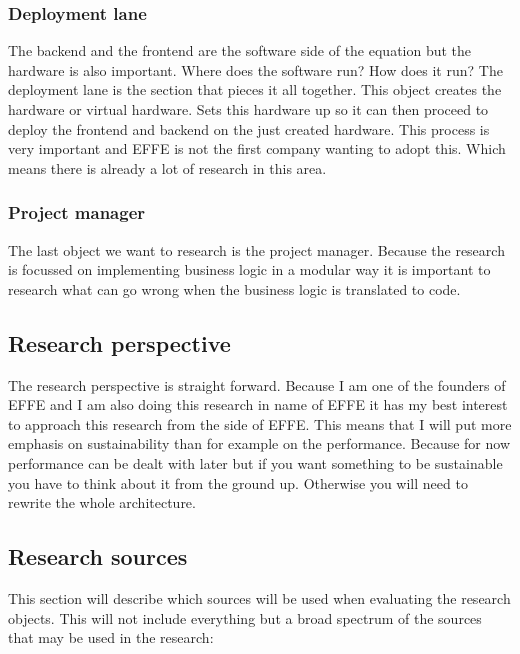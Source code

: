 \documentclass{report}
\begin{document}
\subsubsection{Deployment lane}
The backend and the frontend are the software side of the equation but the hardware is also important. Where does the software run? How does it run? The deployment lane is the section that pieces it all together. This object creates the hardware or virtual hardware. Sets this hardware up so it can then proceed to deploy the frontend and backend on the just created hardware. This process is very important and EFFE is not the first company wanting to adopt this. Which means there is already a lot of research in this area.

\subsubsection{Project manager}
\label{sec:ProjectManager}
The last object we want to research is the project manager. Because the research is focussed on implementing business logic in a modular way it is important to research what can go wrong when the business logic is translated to code.

\subsection{Research perspective}
The research perspective is straight forward. Because I am one of the founders of EFFE and I am also doing this research in name of EFFE it has my best interest to approach this research from the side of EFFE. This means that I will put more emphasis on sustainability than for example on the performance. Because for now performance can be dealt with later but if you want something to be sustainable you have to think about it from the ground up. Otherwise you will need to rewrite the whole architecture.

\subsection{Research sources}
This section will describe which sources will be used when evaluating the research objects. This will not include everything but a broad spectrum of the sources that may be used in the research:
\end{document}
